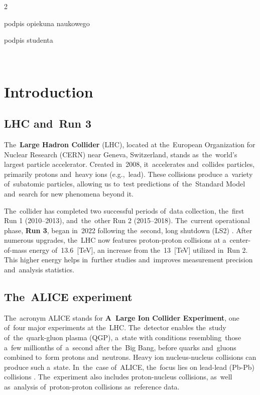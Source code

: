 \documentclass[11pt,a4paper,twoside]{book}
\numberwithin{equation}{chapter}
\begin{document}
\vfill

\begin{multicols}{2}
    \begin{flushleft}
        podpis opiekuna naukowego
    \end{flushleft}
    \begin{flushright}
        podpis studenta
    \end{flushright}
\end{multicols}

\newpage
\mbox{ }

\tableofcontents
{}
\pagestyle{empty}


\chapter{Introduction}
\pagestyle{fancy}

\section{LHC and Run 3}

The \textbf{Large Hadron Collider} (LHC), located at the European Organization for Nuclear Research (CERN) near Geneva, Switzerland, stands as the world's largest particle accelerator. Created in 2008, it accelerates and collides particles, primarily protons and heavy ions (e.g., lead). These collisions produce a variety of subatomic particles, allowing us to test predictions of the Standard Model and search for new phenomena beyond it.

The collider has completed two successful periods of data collection, the first Run 1 (2010--2013), and the other Run 2 (2015--2018). The current operational phase, \textbf{Run 3}, began in 2022 following the second, long shutdown (LS2) \cite{lhc-upgrade}. After numerous upgrades, the LHC now features proton-proton collisions at a center-of-mass energy of 13.6 [TeV], an increase from the 13 [TeV] utilized in Run 2. This higher energy helps in further studies and improves measurement precision and analysis statistics.

\section{The ALICE experiment}

The acronym ALICE stands for \textbf{A Large Ion Collider Experiment}, one of four major experiments at the LHC. The detector enables the study of the quark-gluon plasma (QGP), a state with conditions resembling those a few millionths of a second after the Big Bang, before quarks and gluons combined to form protons and neutrons. Heavy ion nucleus-nucleus collisions can produce such a state. In the case of ALICE, the focus lies on lead-lead (Pb-Pb) collisions \cite{alice-cern}. The experiment also includes proton-nucleus collisions, as well as analysis of proton-proton collisions as reference data.
\end{document}
